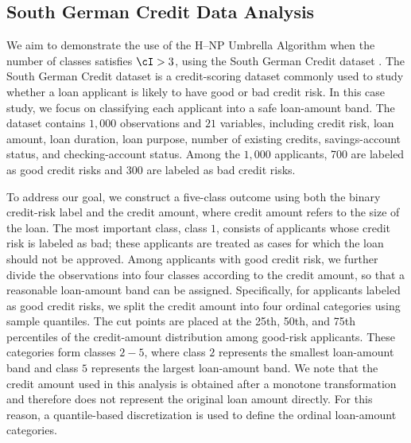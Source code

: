 \subsection{South German Credit Data Analysis}


We aim to demonstrate the use of the H--NP Umbrella Algorithm when the number of classes satisfies $\cI > 3$, using the South German Credit dataset \citep{statlog144}. The South German Credit dataset is a credit-scoring dataset commonly used to study whether a loan applicant is likely to have good or bad credit risk. In this case study, we focus on classifying each applicant into a safe loan-amount band. The dataset contains $1,000$ observations and $21$ variables, including credit risk, loan amount, loan duration, loan purpose, number of existing credits, savings-account status, and checking-account status. Among the $1,000$ applicants, 700 are labeled as good credit risks and 300 are labeled as bad credit risks.

To address our goal, we construct a five-class outcome using both the binary credit-risk label and the credit amount, where credit amount refers to the size of the loan. The most important class, class $1$, consists of applicants whose credit risk is labeled as bad; these applicants are treated as cases for which the loan should not be approved. Among applicants with good credit risk, we further divide the observations into four classes according to the credit amount, so that a reasonable loan-amount band can be assigned. Specifically, for applicants labeled as good credit risks, we split the credit amount into four ordinal categories using sample quantiles. The cut points are placed at the 25th, 50th, and 75th percentiles of the credit-amount distribution among good-risk applicants. These categories form classes $2 - 5$, where class $2$ represents the smallest loan-amount band and class $5$ represents the largest loan-amount band. We note that the credit amount used in this analysis is obtained after a monotone transformation and therefore does not represent the original loan amount directly. For this reason, a quantile-based discretization is used to define the ordinal loan-amount categories. 



